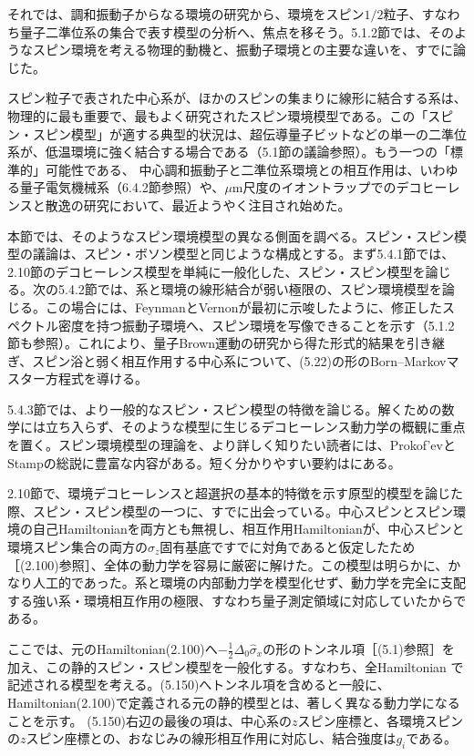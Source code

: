 
それでは、調和振動子からなる環境の研究から、環境をスピン$1/2$粒子、すなわち量子二準位系の集合で表す模型の分析へ、焦点を移そう。5.1.2節では、そのようなスピン環境を考える物理的動機と、振動子環境との主要な違いを、すでに論じた。

スピン粒子で表された中心系が、ほかのスピンの集まりに線形に結合する系は、物理的に最も重要で、最もよく研究されたスピン環境模型である。この「スピン・スピン模型」が適する典型的状況は、超伝導量子ビットなどの単一の二準位系が、低温環境に強く結合する場合である（5.1節の議論参照）。もう一つの「標準的」可能性である、
\hypertarget{srcpage:223}{}\label{srcpage:223}
中心調和振動子と二準位系環境との相互作用は、いわゆる量子電気機械系（6.4.2節参照）や、$\mu\mathrm m$尺度のイオントラップ\cite{ref242}でのデコヒーレンスと散逸の研究において、最近ようやく注目され始めた。

本節では、そのようなスピン環境模型の異なる側面を調べる。スピン・スピン模型の議論は、スピン・ボソン模型と同じような構成とする。まず5.4.1節では、2.10節のデコヒーレンス模型を単純に一般化した、スピン・スピン模型を論じる。次の5.4.2節では、系と環境の線形結合が弱い極限の、スピン環境模型を論じる。この場合には、FeynmanとVernon\cite{ref211}が最初に示唆したように、修正したスペクトル密度を持つ振動子環境へ、スピン環境を写像できることを示す（5.1.2節も参照）。これにより、量子Brown運動の研究から得た形式的結果を引き継ぎ、スピン浴と弱く相互作用する中心系について、(5.22)の形のBorn--Markovマスター方程式を導ける。

5.4.3節では、より一般的なスピン・スピン模型の特徴を論じる。解くための数学には立ち入らず、そのような模型に生じるデコヒーレンス動力学の概観に重点を置く。スピン環境模型の理論を、より詳しく知りたい読者には、Prokof'evとStampの総説\cite{ref199}に豊富な内容がある。短く分かりやすい要約は\cite{ref200}にある。

2.10節で、環境デコヒーレンスと超選択の基本的特徴を示す原型的模型を論じた際、スピン・スピン模型の一つに、すでに出会っている。中心スピンとスピン環境の自己Hamiltonianを両方とも無視し、相互作用Hamiltonianが、中心スピンと環境スピン集合の両方の$\hat\sigma_z$固有基底ですでに対角であると仮定したため［(2.100)参照］、全体の動力学を容易に厳密に解けた。この模型は明らかに、かなり人工的であった。系と環境の内部動力学を模型化せず、動力学を完全に支配する強い系・環境相互作用の極限、すなわち量子測定領域に対応していたからである。

ここでは、元のHamiltonian(2.100)へ$-\frac12\Delta_0\hat\sigma_x$の形のトンネル項［(5.1)参照］を加え、この静的スピン・スピン模型を一般化する。すなわち、全Hamiltonian
で記述される模型を考える。(5.150)へトンネル項を含めると一般に、Hamiltonian(2.100)で定義される元の静的模型とは、著しく異なる動力学になることを示す。
\hypertarget{srcpage:224}{}\label{srcpage:224}
(5.150)右辺の最後の項は、中心系の$z$スピン座標と、各環境スピンの$z$スピン座標との、おなじみの線形相互作用に対応し、結合強度は$g_i$である。

